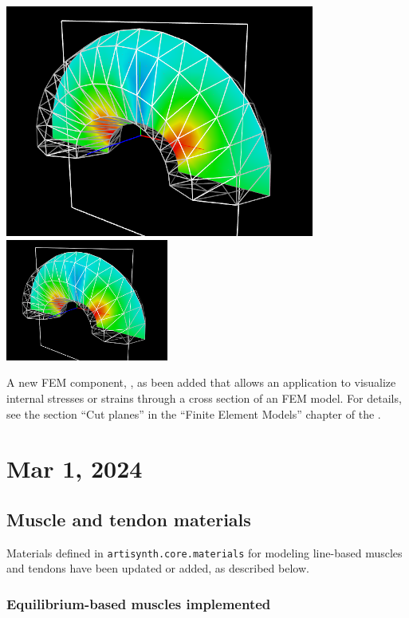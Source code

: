 \documentclass{article}
\begin{document}
%
\begin{center}
\iflatexml
 \includegraphics[]{../modelguide/images/FemCutPlaneDemo}
\else
 \includegraphics[width=0.4\textwidth]{../modelguide/images/FemCutPlaneDemo}
\fi
\end{center}
%

A new FEM component,
, as been added that
allows an application to visualize internal stresses or strains
through a cross section of an FEM model. For details, see the section
``Cut planes'' in the ``Finite Element Models'' chapter of the
.

\section*{Mar 1, 2024}

\subsection*{Muscle and tendon materials}

Materials defined in {\tt artisynth.core.materials} for modeling
line-based muscles and tendons have been updated or added, as
described below.

\subsubsection{Equilibrium-based muscles implemented}
\end{document}

